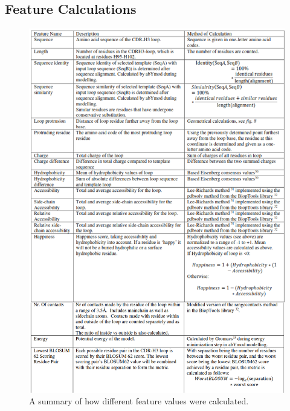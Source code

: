 \documentclass[preprint,12pt]{elsarticle}
\begin{document}
\subsection{Feature Calculations}
\begin{figure}[h!]
  \centering
  \includegraphics[scale=0.49]{feature_table.png}
  \caption {A summary of how different feature values were calculated.}
  \label{fig:feature_table}
\end{figure}
\end{document}
